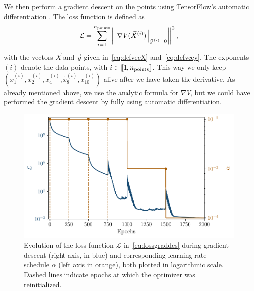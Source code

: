 \documentclass[11pt,a4paper]{article}
\begin{document}
	We then perform a gradient descent on the points using TensorFlow’s automatic differentiation \cite{tensorflow2015-whitepaper}. The loss function is defined as
	\begin{equation} \label{eq:lossgraddes}
		\mathcal{L} = \sum_{i = 1}^{n_{\rm points}} \left|\left|\left.\nabla V(\vec{X}^{(i)})\,\right|_{\vec{y}^{\,(i)}=0}\right|\right|^2,
	\end{equation}
with the vectors $\vec{X}$ and $\vec{y}$ given in~\eqref{eq:defvecX} and~\eqref{eq:defvecy}. The exponents $(i)$ denote the data points, with $i\in\llbracket1,n_{\rm points}\rrbracket$. This way we only keep $(x^{(i)}_1,x^{(i)}_2,x^{(i)}_4,\tilde{x}^{(i)}_8,x^{(i)}_{10})$ alive after we have taken the derivative. As already mentioned above, we use the analytic formula for $\nabla V$, but we could have performed the gradient descent by fully using automatic differentiation.

	\begin{figure}
		\centering
		\includegraphics[scale = 0.75]{Figures/Loss_grad_des_21_05_2025.pdf}
		\caption{Evolution of the loss function $\mathcal{L}$ in~\eqref{eq:lossgraddes} during gradient descent (right axis, in blue) and corresponding learning rate schedule $\alpha$ (left axis in orange), both plotted in logarithmic scale. Dashed lines indicate epochs at which the optimizer was reinitialized.}
		\label{fig:loss_grad_des}
	\end{figure}
\end{document}
